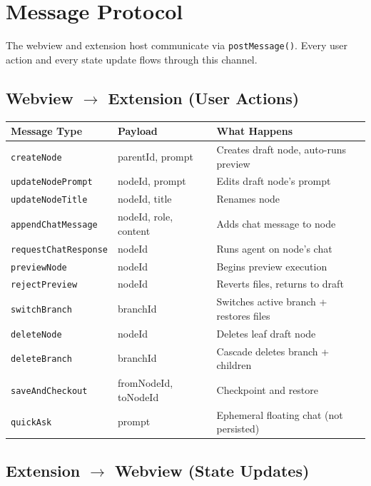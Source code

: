 \documentclass[12pt, a4paper]{article}
\begin{document}
\newpage

\section{Message Protocol}

The webview and extension host communicate via \texttt{postMessage()}. Every user action and every state update flows through this channel.

\subsection{Webview $\to$ Extension (User Actions)}

\begin{longtable}{@{}p{4.5cm}p{4cm}p{5cm}@{}}
\toprule
\textbf{Message Type} & \textbf{Payload} & \textbf{What Happens} \\
\midrule
\endhead
\texttt{createNode} & parentId, prompt & Creates draft node, auto-runs preview \\
\texttt{updateNodePrompt} & nodeId, prompt & Edits draft node's prompt \\
\texttt{updateNodeTitle} & nodeId, title & Renames node \\
\texttt{appendChatMessage} & nodeId, role, content & Adds chat message to node \\
\texttt{requestChatResponse} & nodeId & Runs agent on node's chat \\
\texttt{previewNode} & nodeId & Begins preview execution \\
\texttt{rejectPreview} & nodeId & Reverts files, returns to draft \\
\texttt{switchBranch} & branchId & Switches active branch + restores files \\
\texttt{deleteNode} & nodeId & Deletes leaf draft node \\
\texttt{deleteBranch} & branchId & Cascade deletes branch + children \\
\texttt{saveAndCheckout} & fromNodeId, toNodeId & Checkpoint and restore \\
\texttt{quickAsk} & prompt & Ephemeral floating chat (not persisted) \\
\bottomrule
\end{longtable}

\subsection{Extension $\to$ Webview (State Updates)}
\end{document}
